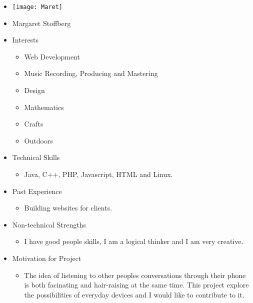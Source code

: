 
\begin{itemize}
	\item[] \texttt{[image: Maret]}
	\item[] Margaret Stoffberg
	\item Interests
	\begin{itemize}
		\item Web Development
		\item Music Recording, Producing and Mastering
		\item Design
		\item Mathematics
		\item Crafts
		\item Outdoors
	\end{itemize}
	\item Technical Skills
	\begin{itemize}
		\item[] Java, C++, PHP, Javascript, HTML and Linux.
	\end{itemize}
	\item Past Experience
	\begin{itemize}
		\item[] Building websites for clients.
	\end{itemize}
	\item Non-technical Strengths
	\begin{itemize}
		\item[] I have good people skills, I am a logical thinker and I am very creative.
	\end{itemize}
	\item Motivation for Project
	\begin{itemize}
		\item[] The idea of listening to other peoples conversations through their phone is both facinating and hair-raising at the same time. This project explore the possibilities of everyday devices and I would like to contribute to it. 
	\end{itemize}
\end{itemize}

